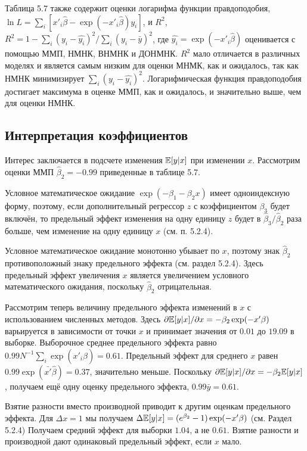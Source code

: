 Таблица 5.7 также содержит оценки логарифма функции правдоподобия, $\ln L=\sum_i [x'_i\hat{\beta}-\exp(-x'_i\hat{\beta})y_i]$, и $R^2$, $R^2=1-\sum_i (y_i-\hat{y_i})^2/\sum_i (y_i-\bar{y})^2$, где $\hat{y_i}=\exp(-x'_i\hat{\beta})$ оценивается с помощью ММП, НМНК, ВНМНК и ДОНМНК. $R^2$ мало отличается в различных моделях и является самым низким для оценки МНМК, как и ожидалось, так как НМНК минимизирует $\sum_i (y_i-\hat{y_i})^2$. Логарифмическая функция правдоподобия достигает максимума в оценке ММП, как и ожидалось, и значительно выше, чем для оценки НМНК.

\subsection{Интерпретация коэффициентов}

Интерес заключается в подсчете изменения $\mathbb{E}[y|x]$ при изменении $x$. Рассмотрим оценки ММП $\hat{\beta}_2=-0.99$ приведенные в таблице 5.7.

Условное математическое ожидание $\exp(-\beta_1-\beta_2x)$ имеет одноиндексную форму, поэтому, если дополнительный регрессор $z$ с коэффициентом $\beta_3$ будет включён, то предельный эффект изменения на одну единицу $z$ будет в $\hat{\beta}_3/\hat{\beta}_2$ раза больше, чем изменение на одну единицу $x$ (см. п. 5.2.4).

Условное математическое ожидание монотонно убывает по $x$, поэтому знак $\hat{\beta}_2$ противоположный знаку предельного эффекта (см. раздел 5.2.4). Здесь предельный эффект увеличения $x$ является увеличением условного математического ожидания, поскольку $\hat{\beta}_2$ отрицательная.

Рассмотрим теперь величину предельного эффекта изменений в $x$ с использованием численных методов. Здесь $\partial \mathbb{E}[y|x]/\partial x=-\beta_2 \exp(-x'\beta)$ варьируется в зависимости от точки $x$ и принимает значения от $0.01$ до $19.09$ в выборке. Выборочное среднее предельного эффекта равно $0.99 N^{-1} \sum_i \exp(x'_i\hat{\beta})=0.61$. Предельный эффект для среднего  $x$ равен $0.99 \exp(\bar{x'}\hat{\beta})=0.37$, значительно меньше. Поскольку $\partial \mathbb{E}[y|x]/\partial x=-\beta_2 \mathbb{E}[y|x]$, получаем ещё одну оценку предельного эффекта, $0.99\bar{y}=0.61$.

Взятие разности вместо производной приводит к другим оценкам предельного эффекта. Для $\Delta x=1$ мы получаем $\Delta \mathbb{E}[y|x]=(e^{\beta_2}-1)\exp(-x'\beta)$ (см. Раздел 5.2.4) Получаем средний эффект для выборки $1.04$, а не $0.61$. Взятие разности и производной дают одинаковый предельный эффект, если $x$ мало.

